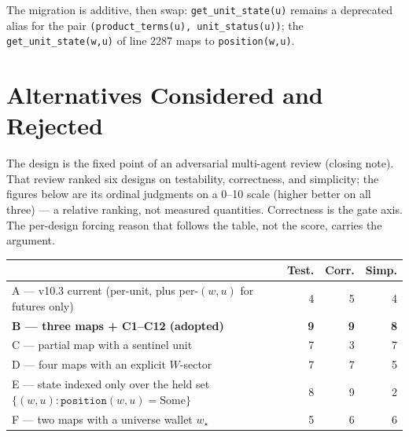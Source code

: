 \documentclass[11pt,a4paper]{article}
\begin{document}
\noindent The migration is additive, then swap: \texttt{get\_unit\_state(u)} remains a
deprecated alias for the pair \texttt{(product\_terms(u), unit\_status(u))}; the
\texttt{get\_unit\_state(w,u)} of line 2287 maps to \texttt{position(w,u)}.

\section{Alternatives Considered and Rejected}
\label{sec:pareto}

The design is the fixed point of an adversarial multi-agent review (closing note). That
review ranked six designs on testability, correctness, and simplicity; the figures below are
its ordinal judgments on a 0--10 scale (higher better on all three) --- a relative ranking,
not measured quantities. Correctness is the gate axis. The per-design forcing reason that
follows the table, not the score, carries the argument.

\begin{longtable}{p{8.0cm}rrr}
\toprule
 & \textbf{Test.} & \textbf{Corr.} & \textbf{Simp.} \\
\midrule
A --- v10.3 current (per-unit, plus per-$(w,u)$ for futures only) & 4 & 5 & 4 \\
\textbf{B --- three maps + C1--C12 (adopted)} & \textbf{9} & \textbf{9} & \textbf{8} \\
C --- partial map with a sentinel unit & 7 & 3 & 7 \\
D --- four maps with an explicit $W$-sector & 7 & 7 & 5 \\
E --- state indexed only over the held set $\{(w,u): \texttt{position}(w,u)=\mathrm{Some}\}$ & 8 & 9 & 2 \\
F --- two maps with a universe wallet $w_\star$ & 5 & 6 & 6 \\
\bottomrule
\end{longtable}
\end{document}
